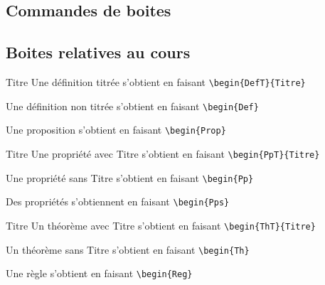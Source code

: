 \begin{pageCours}
\section{Commandes de boites}

\subsection{Boites relatives au cours}

\begin{DefT}{Titre}
Une définition titrée s'obtient en faisant \verb|\begin{DefT}{Titre}|
\end{DefT}

\begin{Def}
Une définition non titrée s'obtient en faisant \verb|\begin{Def}|
\end{Def}

\begin{Prop}
Une proposition s'obtient en faisant \verb|\begin{Prop}|
\end{Prop}

\begin{PpT}{Titre}
Une propriété avec Titre s'obtient en faisant \verb|\begin{PpT}{Titre}|
\end{PpT}

\begin{Pp}
Une propriété sans Titre s'obtient en faisant \verb|\begin{Pp}|
\end{Pp}

\begin{Pps}
Des propriétés s'obtiennent en faisant \verb|\begin{Pps}|
\end{Pps}

\begin{ThT}{Titre}
Un théorème avec Titre s'obtient en faisant \verb|\begin{ThT}{Titre}|
\end{ThT}

\begin{Th}
Un théorème sans Titre s'obtient en faisant \verb|\begin{Th}|
\end{Th}

\begin{Reg}
Une règle s'obtient en faisant \verb|\begin{Reg}|
\end{Reg}


\end{pageCours}
